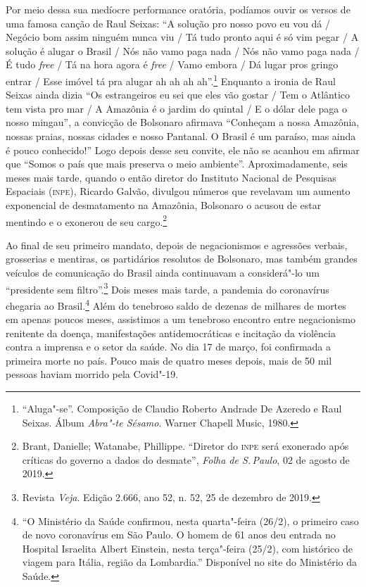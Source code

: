 Por meio dessa sua medíocre performance oratória, podíamos ouvir os
versos de uma famosa canção de Raul Seixas: ``A solução pro nosso povo
eu vou dá / Negócio bom assim ninguém nunca viu / Tá tudo pronto aqui é
só vim pegar / A solução é alugar o Brasil / Nós não vamo paga nada /
Nós não vamo paga nada / É tudo \emph{free} / Tá na hora agora é
\emph{free} / Vamo embora / Dá lugar pros gringo entrar / Esse imóvel tá
pra alugar ah ah ah ah''.\footnote{``Aluga"-se''. Composição de Claudio
  Roberto Andrade De Azeredo e Raul Seixas. Álbum \emph{Abra"-te Sésamo}.
  Warner Chapell Music, 1980.} Enquanto a ironia de Raul Seixas ainda
dizia ``Os estrangeiros eu sei que eles vão gostar / Tem o Atlântico tem
vista pro mar / A Amazônia é o jardim do quintal / E o dólar dele paga o
nosso mingau'', a convicção de Bolsonaro afirmava ``Conheçam a nossa
Amazônia, nossas praias, nossas cidades e nosso Pantanal. O Brasil é um
paraíso, mas ainda é pouco conhecido!'' Logo depois desse seu
convite, ele não se acanhou em afirmar que ``Somos o país que mais
preserva o meio ambiente''. Aproximadamente, seis meses mais tarde,
quando o então diretor do Instituto Nacional de Pesquisas Espaciais
(\textsc{inpe}), Ricardo Galvão, divulgou números que revelavam um aumento
exponencial de desmatamento na Amazônia, Bolsonaro o acusou de estar
mentindo e o exonerou de seu cargo.\footnote{Brant, Danielle; Watanabe,
  Phillippe. ``Diretor do \textsc{inpe} será exonerado após críticas do governo a
  dados do desmate'', \textit{Folha de S.\,Paulo}, 02 de agosto de 2019.}

Ao final de seu primeiro mandato, depois de negacionismos e agressões
verbais, grosserias e mentiras, os partidários resolutos de Bolsonaro,
mas também grandes veículos de comunicação do Brasil ainda continuavam a
considerá"-lo um ``presidente sem filtro''.\footnote{Revista \emph{Veja}.
  Edição 2.666, ano 52, n. 52, 25 de dezembro de 2019.} Dois meses mais
tarde, a pandemia do coronavírus chegaria ao Brasil.\footnote{``O
  Ministério da Saúde confirmou, nesta quarta"-feira (26/2), o primeiro
  caso de novo coronavírus em São Paulo. O homem de 61 anos deu entrada
  no Hospital Israelita Albert Einstein, nesta terça"-feira (25/2), com
  histórico de viagem para Itália, região da Lombardia.'' Disponível no site do Ministério da Saúde.}
Além do tenebroso saldo de dezenas de milhares de mortes em apenas
poucos meses, assistimos a um tenebroso encontro entre negacionismo
renitente da doença, manifestações antidemocráticas e incitação da
violência contra a imprensa e o setor da saúde. No dia 17 de março, foi
confirmada a primeira morte no país. Pouco mais de quatro meses depois,
mais de 50 mil pessoas haviam morrido pela Covid"-19.

